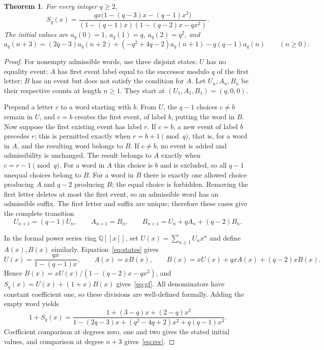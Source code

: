 \documentclass[11pt]{article}
\newtheorem{theorem}{Theorem}
\newcommand{\aq}{a_q}
\begin{document}
\begin{theorem}\label{thm:general}
For every integer $q\geq2$,
\begin{equation}\label{eq:gf}
 S_q(x)=\frac{qx\bigl(1-(q-3)x-(q-1)x^2\bigr)}
 {(1-(q-1)x)(1-(q-2)x-qx^2)}.
\end{equation}
The initial values are $\aq(0)=1$, $\aq(1)=q$, $\aq(2)=q^2$, and
\begin{equation}\label{eq:rec}
 \aq(n+3)=(2q-3)\aq(n+2)+(-q^2+4q-2)\aq(n+1)
                -q(q-1)\aq(n)\qquad(n\geq0).
\end{equation}
\end{theorem}

\begin{proof}
For nonempty admissible words, use three disjoint states: $U$ has no equality
event; $A$ has first event label equal to the successor modulo $q$ of the
first letter; $B$ has an event but does not satisfy the condition for $A$.
Let $U_n,A_n,B_n$ be their respective counts at length $n\geq1$.
They start at $(U_1,A_1,B_1)=(q,0,0)$.

Prepend a letter $c$ to a word starting with $b$.
From $U$, the $q-1$ choices $c\ne b$ remain in $U$, and $c=b$ creates
the first event, of label $b$, putting the word in $B$.
Now suppose the first existing event has label $r$.
If $c=b$, a new event of label $b$ precedes $r$; this is permitted exactly
when $r=b+1\pmod q$, that is, for a word in $A$, and the resulting word
belongs to $B$.
If $c\ne b$, no event is added and admissibility is unchanged. The result
belongs to $A$ exactly when $c=r-1\pmod q$. For a word in $A$ this choice
is $b$ and is excluded, so all $q-1$ unequal choices belong to $B$.
For a word in $B$ there is exactly one allowed choice producing $A$ and
$q-2$ producing $B$; the equal choice is forbidden.
Removing the first letter deletes at most the first event, so an admissible
word has an admissible suffix. The first letter and suffix are unique;
therefore these cases give the complete transition
\begin{equation}\label{eq:states}
 U_{n+1}=(q-1)U_n,\qquad A_{n+1}=B_n,\qquad
 B_{n+1}=U_n+qA_n+(q-2)B_n.
\end{equation}

In the formal power series ring $\mathbb Q[[x]]$, set
$U(x)=\sum_{n\geq1}U_nx^n$ and define $A(x),B(x)$ similarly.
Equation~\eqref{eq:states} gives
\[
 U(x)=\frac{qx}{1-(q-1)x},\qquad A(x)=xB(x),\qquad
 B(x)=xU(x)+qxA(x)+(q-2)xB(x).
\]
Hence $B(x)=xU(x)/(1-(q-2)x-qx^2)$, and
$S_q(x)=U(x)+(1+x)B(x)$ gives~\eqref{eq:gf}. All denominators have
constant coefficient one, so these divisions are well-defined formally.
Adding the empty word yields
\begin{equation}\label{eq:fullgf}
 1+S_q(x)=\frac{1+(3-q)x+(2-q)x^2}
 {1-(2q-3)x+(q^2-4q+2)x^2+q(q-1)x^3}.
\end{equation}
Coefficient comparison at degrees zero, one and two gives the stated
initial values, and comparison at degree $n+3$ gives~\eqref{eq:rec}.
\end{proof}
\end{document}
